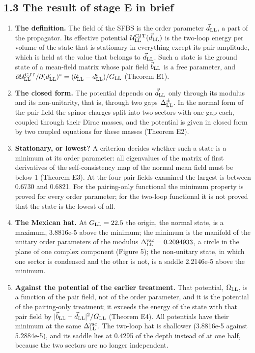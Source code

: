 \documentclass[
  10pt,
]{article}
\providecommand{\tightlist}{%
  \setlength{\itemsep}{0pt}\setlength{\parskip}{0pt}}
\begin{document}
\hypertarget{the-result-of-stage-e-in-brief}{%
\subsection{1.3 The result of stage E in
brief}\label{the-result-of-stage-e-in-brief}}

\begin{enumerate}
\def\labelenumi{\arabic{enumi}.}
\tightlist
\item
  \textbf{The definition.} The field of the SFBS is the order parameter
  \(\vec d_{\rm LL}\), a part of the propagator. Its effective potential
  \(\mathcal U^{\rm CJT}_{\rm LL}(\vec d_{\rm LL})\) is the two-loop
  energy per volume of the state that is stationary in everything except
  its pair amplitude, which is held at the value that belongs to
  \(\vec d_{\rm LL}\). Such a state is the ground state of a mean-field
  matrix whose pair field \(\vec b_{\rm LL}\) is a free parameter, and
  \(\partial\mathcal U^{\rm CJT}_{\rm LL}/\partial(d^\iota_{\rm LL})^*=(b^\iota_{\rm LL}-d^\iota_{\rm LL})/G_{\rm LL}\)
  (Theorem E1).
\item
  \textbf{The closed form.} The potential depends on \(\vec d_{\rm LL}\)
  only through its modulus and its non-unitarity, that is, through two
  gaps \(\Delta^\pm_{\rm LL}\). In the normal form of the pair field the
  spinor charges split into two sectors with one gap each, coupled
  through their Dirac masses, and the potential is given in closed form
  by two coupled equations for these masses (Theorem E2).
\item
  \textbf{Stationary, or lowest?} A criterion decides whether such a
  state is a minimum at its order parameter: all eigenvalues of the
  matrix of first derivatives of the self-consistency map of the normal
  mean field must be below 1 (Theorem E3). At the four pair fields
  examined the largest is between 0.6730 and 0.6821. For the
  pairing-only functional the minimum property is proved for every order
  parameter; for the two-loop functional it is not proved that the state
  is the lowest of all.
\item
  \textbf{The Mexican hat.} At \(G_{\rm LL}=22.5\) the origin, the
  normal state, is a maximum, 3.8816e-5 above the minimum; the minimum
  is the manifold of the unitary order parameters of the modulus
  \(\Delta^{\rm vac}_{\rm LL}=0.2094933\), a circle in the plane of one
  complex component (Figure 5); the non-unitary state, in which one
  sector is condensed and the other is not, is a saddle 2.2146e-5 above
  the minimum.
\item
  \textbf{Against the potential of the earlier treatment.} That
  potential, \(\Omega_{\rm LL}\), is a function of the pair field, not
  of the order parameter, and it is the potential of the pairing-only
  treatment; it exceeds the energy of the state with that pair field by
  \(\lvert\vec b_{\rm LL}-\vec d_{\rm LL}\rvert^2/G_{\rm LL}\) (Theorem
  E4). All potentials have their minimum at the same
  \(\Delta^{\rm vac}_{\rm LL}\). The two-loop hat is shallower
  (3.8816e-5 against 5.2884e-5), and its saddle lies at 0.4295 of the
  depth instead of at one half, because the two sectors are no longer
  independent.
\end{enumerate}
\end{document}
